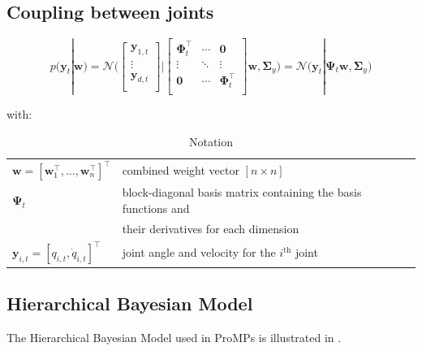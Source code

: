 \documentclass{article}
\begin{document}
\subsection{Coupling between joints}

\begin{equation}
p(\bm{y}_t|\bm{w}) = \mathcal{N}\Bigg(
        \begin{bmatrix}
                \bm{y}_{1,t} \\
                \vdots\\
                \bm{y}_{d,t} \\
        \end{bmatrix}
        \Bigg|
        \begin{bmatrix}
                \bm{\Phi}^{\top}_{t} & \cdots & \bm{0} \\
                \vdots &\ddots & \vdots\\
                \bm{0} & \cdots & \bm{\Phi}^{\top}_{t} \\
        \end{bmatrix}
        \bm{w}, \bm{\Sigma}_y
\Bigg) = \mathcal{N}\Big(\bm{y}_t|\bm{\Psi}_t\bm{w},\bm{\Sigma}_y \Big)
\end{equation}

with:
\begin{table}[h]
  \centering
  \caption{Notation}
  \begin{tabular}{ll}
    \toprule
    $\bm{w}=[\bm{w}^\top_1, \dots, \bm{w}^\top_n]^\top$ & combined weight vector $[n \times n]$\\
     $\bm{\Psi}_t$ & block-diagonal basis matrix containing the basis functions and\\&their derivatives for each dimension\\
     $\bm{y}_{i,t} = [q_{i,t}, \dot{q}_{i,t}]^\top$ & joint angle and velocity for the $i^{\text{th}}$ joint\\
     \bottomrule
  \end{tabular}
\end{table}

\subsection{Hierarchical Bayesian Model}

The Hierarchical Bayesian Model used in ProMPs is illustrated in .
\end{document}
